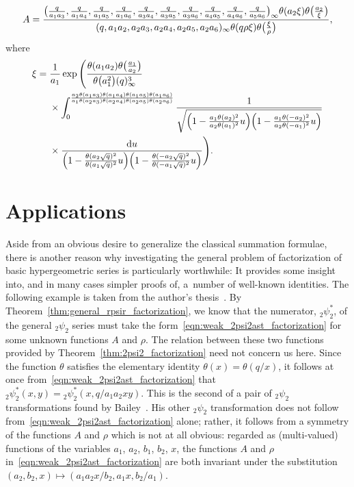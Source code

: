 \documentclass[10pt,a4paper]{amsart}
\numberwithin{equation}{section}
\newcommand{\dd}{\mathrm{d}}
\begin{document}
\begin{Remark}
\begin{itemize}
\[ A = {\bigl({q \over a_1a_3},{q \over a_1a_4},{q \over a_1a_5},{q \over a_1a_6},{q \over a_3a_4},{q \over a_3a_5},{q \over a_3a_6},{q \over a_4a_5},{q \over a_4a_6},{q \over a_5a_6}\bigr)_{ \infty} \theta(a_2\xi) \theta\bigl({a_2 \over \xi}\bigr) \over (q,a_1a_2,a_2a_3,a_2a_4,a_2a_5,a_2a_6)_{ \infty} \theta(q\rho\xi)\theta\bigl({\xi \over \rho}\bigr)} ,\]
where
\begin{align*}
\xi={}& {1 \over a_1}\exp \Bigg( {\theta(a_1a_2) \theta\bigl({a_1 \over a_2}\bigr) \over \theta\bigl(a_1^2\bigr) (q)_\infty^3} \\
&\times \int_0^{{a_2\theta(a_1a_3)\theta(a_1a_4)\theta(a_1a_5)\theta(a_1a_6) \over a_1\theta(a_2a_3)\theta(a_2a_4)\theta(a_2a_5)\theta(a_2a_6)}}\frac{1}{\sqrt{\Bigl(1-{a_1\theta(a_2)^2 \over a_2\theta(a_1)^2}u\Bigr) \Bigl(1-{a_1\theta(-a_2)^2 \over a_2\theta(-a_1)^2}u\Bigr)}} \\
&\times {\dd u \over \Bigl(1-{\theta(a_2\sqrt{q})^2 \over \theta(a_1\sqrt{q})^2}u\Bigr) \Bigl(1-{\theta(-a_2\sqrt{q})^2 \over \theta(-a_1\sqrt{q})^2}u\Bigr)} \Bigg).
\end{align*}
\end{itemize}
\end{Remark}

\section{Applications}

Aside from an obvious desire to generalize the classical summation formulae, there is another reason why investigating the general problem of factorization of basic hypergeometric series is particularly worthwhile: It provides some insight into, and in many cases simpler proofs of, a~number of well-known identities. The following example is taken from the author's thesis~\cite[Section~3.6]{Bradley-Thrush2023}. By Theorem~\ref{thm:general_rpsir_factorization}, we know that the numerator, $_2^{}\psi_2^\ast$, of the general $_2\psi_2$ series must take the form~\eqref{eqn:weak_2psi2ast_factorization} for some unknown functions $A$ and $\rho$. The relation between these two functions provided by Theorem~\ref{thm:2psi2_factorization} need not concern us here. Since the function $\theta$ satisfies the elementary identity $\theta(x) = \theta(q/x)$, it follows at once from~\eqref{eqn:weak_2psi2ast_factorization} that
${}_2^{}\psi_2^\ast(x,y) = {}_2^{}\psi_2^\ast(x,q/a_1a_2xy)$.
This is the second of a pair of $_2\psi_2$ transformations found by Bailey~\cite[equations~(2.3) and~(2.4)]{Bailey1950}. His other $_2\psi_2$ transformation does not follow from~\eqref{eqn:weak_2psi2ast_factorization} alone; rather, it follows from a symmetry of the functions $A$ and $\rho$ which is not at all obvious: regarded as (multi-valued) functions of the variables $a_1$, $a_2$, $b_1$, $b_2$, $x$, the functions $A$ and $\rho$ in~\eqref{eqn:weak_2psi2ast_factorization} are both invariant under the substitution $(a_2,b_2,x) \mapsto (a_1a_2x/b_2,a_1x,b_2/a_1)$.
\end{document}
